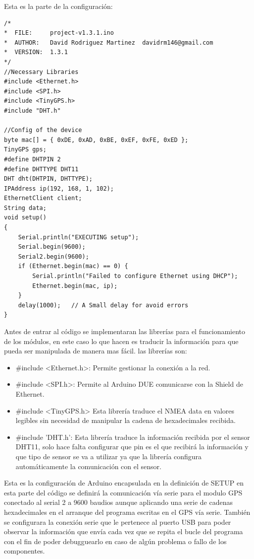 Esta es la parte de la configuración:

\begin{lstlisting}
/*
*  FILE:     project-v1.3.1.ino
*  AUTHOR:   David Rodriguez Martinez  davidrm146@gmail.com
*  VERSION:  1.3.1
*/
//Necessary Libraries
#include <Ethernet.h>
#include <SPI.h>
#include <TinyGPS.h>
#include "DHT.h"

//Config of the device
byte mac[] = { 0xDE, 0xAD, 0xBE, 0xEF, 0xFE, 0xED };
TinyGPS gps;
#define DHTPIN 2  
#define DHTTYPE DHT11  
DHT dht(DHTPIN, DHTTYPE);
IPAddress ip(192, 168, 1, 102);
EthernetClient client;
String data;
void setup()
{  
	Serial.println("EXECUTING setup");
	Serial.begin(9600);
	Serial2.begin(9600);
	if (Ethernet.begin(mac) == 0) {
		Serial.println("Failed to configure Ethernet using DHCP");
		Ethernet.begin(mac, ip);
	}
	delay(1000);   // A Small delay for avoid errors
}
\end{lstlisting}

Antes de entrar al código se implementaran las librerías para el funcionamiento de los módulos, en este caso lo que hacen es traducir la información para que pueda ser manipulada de manera mas fácil. las librerías son:

\begin{itemize}
	\item \#include <Ethernet.h>: Permite gestionar la conexión a la red.
	\item \#include <SPI.h>: Permite al Arduino DUE comunicarse con la Shield de Ethernet.
	\item \#include <TinyGPS.h> Esta librería traduce el NMEA data en valores legibles sin necesidad de manipular la cadena de hexadecimales recibida.
	\item \#include 'DHT.h':  Esta librería traduce la información recibida por el sensor DHT11, solo hace falta configurar que pin es el que recibirá la información y que tipo de sensor se va a utilizar ya que la librería configura automáticamente la comunicación con el sensor.
\end{itemize}

Esta es la configuración de Arduino encapsulada en la definición de SETUP en esta parte del código se definirá la comunicación vía serie para el modulo GPS conectado al serial 2 a 9600 baudios aunque aplicando una serie de cadenas hexadecimales en el arranque del programa escritas en el GPS vía serie.
También se configurara la conexión serie que le pertenece al puerto USB para poder observar la información que envía cada vez que se repita el bucle del programa con el fin de poder debugguearlo en caso de algún problema o fallo de los componentes.\\

